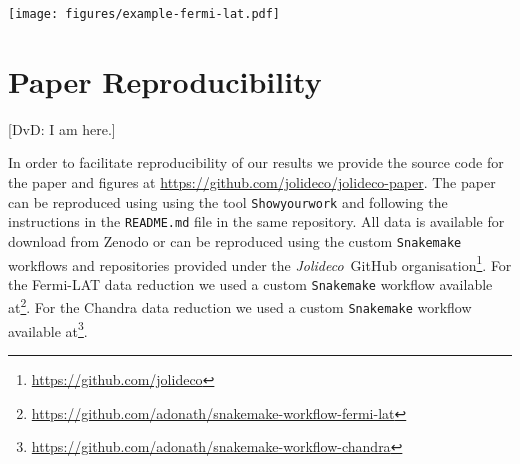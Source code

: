 \documentclass[twocolumn]{aastex631}
\newcommand{\fermi}{\textit{Fermi}-LAT~}
\newcommand{\jolideco}{\textit{Jolideco}~}
\newcommand{\vlk}[1]{{\color{blue} [VLK: #1]}}
\newcommand{\dvd}[1]{{\color{red} [DvD: #1]}}
\begin{document}
      \begin{figure*}
        \begin{centering}
            \texttt{[image: figures/example-fermi-lat.pdf]}
            \caption{
                Illustration of \dvd{\jolideco} result %
                \dvd{for the} \fermi data of the supernova remnant \textit{RX J0852.0-4622} or \textit{Vela Junior}. The left image shows the counts above \qty[mode = text]{10}{GeV}. The different event classes are stacked into a single image \vlk{with bin size $0.02$~degrees}. The image in the center shows the flux reconstructed by the \jolideco method. The image on the right shows the \dvd{standardized} residuals as computed by Equation~\ref{eq:approx-sigma} and smoothed with a \textit{Gaussian} kernel of width 5~pixels \vlk{$\approx 0.1$~degrees, similar to the size of the PSF}. More information on this analysis example can be found on \url{https://github.com/jolideco/jolideco-fermi-examples}.
            }
            \label{fig:example-fermi-lat}
        \end{centering}
    \end{figure*}
    
    \section{Paper Reproducibility}
    \label{sec:reproducibility}

        \dvd{I am here.}
        
    In order to facilitate reproducibility of our results we provide the source code for the paper and figures at \url{https://github.com/jolideco/jolideco-paper}. The paper can be reproduced using using the tool \texttt{Showyourwork} \citep{Luger2021} and following the instructions in the \texttt{README.md} file in the same repository. All data is available for download from Zenodo or can be reproduced using the custom  \texttt{Snakemake} workflows and repositories provided under the \jolideco GitHub organisation\footnote{\url{https://github.com/jolideco}}. For the Fermi-LAT data reduction we used a custom \texttt{Snakemake} workflow  available at\footnote{\url{https://github.com/adonath/snakemake-workflow-fermi-lat}}. For the Chandra data reduction we used a custom \texttt{Snakemake} workflow available at\footnote{\url{https://github.com/adonath/snakemake-workflow-chandra}}.
        
    
\end{document}
